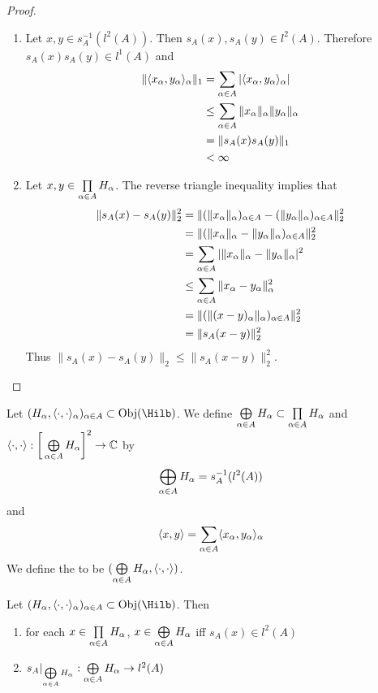\documentclass{book}
\begin{document}
\begin{proof}\
	\begin{enumerate}
		\item Let $x,y \in s_A^{-1}(l^2(A))$. Then $s_A(x), s_A(y) \in l^2(A)$. Therefore $s_A(x)s_A(y) \in l^1(A)$ and
		\begin{align*}
			\|\langle x_{\alpha}, y_{\alpha} \rangle_{\alpha}\|_1
			& = \sum_{\alpha \in A} |\langle x_{\alpha}, y_{\alpha} \rangle_{\alpha}| \\
			& \leq \sum_{\alpha \in A} \| x_{\alpha} \|_{\alpha} \|y_{\alpha}\|_{\alpha} \\
			& = \|s_A(x)s_A(y)\|_1 \\
			& < \infty 
		\end{align*}
		\item Let $x,y \in \prod\limits_{\alpha \in A} H_{\alpha}$. The reverse triangle inequality implies that 
		\begin{align*}
			\|s_A(x) - s_A(y)\|_2^2
			& = \|(\|x_{\alpha}\|_{\alpha})_{\alpha \in A} - (\|y_{\alpha}\|_{\alpha})_{\alpha \in A} \|_2^2 \\
			& = \|(\|x_{\alpha}\|_{\alpha} - \|y_{\alpha}\|_{\alpha})_{\alpha \in A} \|_2^2 \\
			& = \sum_{\alpha \in A} |\|x_{\alpha}\|_{\alpha} - \|y_{\alpha}\|_{\alpha}|^2 \\
			& \leq \sum_{\alpha \in A} \|x_{\alpha} - y_{\alpha} \|_{\alpha}^2 \\
			& = \|(\| (x- y)_{\alpha} \|_{\alpha})_{\alpha \in A}\|_2^2 \\
			& = \|s_A(x - y)\|_2^2
		\end{align*}
		Thus $\|s_A(x) - s_A(y)\|_2 \leq \|s_A(x - y)\|_2^2$.
	\end{enumerate}
\end{proof}

\begin{defn}
	Let $(H_\al, \l\cdot, \cdot \r_{\al})_{\al \in A} \subset \Obj(\Hilb)$. We define $\bigoplus\limits_{\alpha \in A} H_{\alpha} \subset \prod\limits_{\alpha \in A} H_{\alpha}$ and $\langle\cdot, \cdot \rangle: \bigg[ \bigoplus\limits_{\alpha \in A} H_{\alpha} \bigg]^2 \rightarrow \mathbb{C}$ by  
	$$\bigoplus\limits_{\alpha \in A} H_{\alpha} = s_A^{-1}(l^2(A))$$
	and 
	$$\langle x, y \rangle = \sum\limits_{\alpha \in A} \langle x_{\alpha}, y_{\alpha} \rangle_{\alpha}$$
	We define the  to be $(\bigoplus\limits_{\alpha \in A} H_{\alpha}, \langle \cdot, \cdot\rangle)$.
\end{defn}
	
\begin{ex}
	Let $(H_\al, \l\cdot, \cdot \r_{\al})_{\al \in A} \subset \Obj(\Hilb)$. Then 
	\begin{enumerate}
		\item for each $x \in \prod\limits_{\alpha \in A} H_{\alpha}$, $x \in \bigoplus\limits_{\alpha \in A} H_{\alpha}$ iff $s_A(x) \in l^2(A)$
		\item $s_A|_{\bigoplus\limits_{\alpha \in A} H_{\alpha}}: \bigoplus\limits_{\alpha \in A} H_{\alpha} \rightarrow l^2(A)$
	\end{enumerate}
\end{ex}
\end{document}
